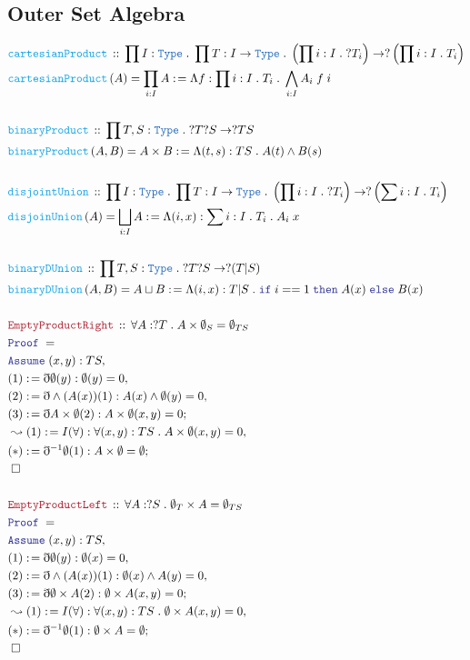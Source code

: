 \documentclass[12pt]{scrartcl}
\newcommand{\TYPE}[1]{\textcolor{NavyBlue}{\mathtt{#1}}}
\newcommand{\FUNC}[1]{\textcolor{Cerulean}{\mathtt{#1}}}
\newcommand{\LOGIC}[1]{\textcolor{Blue}{\mathtt{#1}}}
\newcommand{\THM}[1]{\textcolor{Maroon}{\mathtt{#1}}}
\renewcommand{\.}{\; . \;}
\newcommand{\de}{: \kern 0.1pc =}
\newcommand{\If}{\LOGIC{if} \;}
\newcommand{\Then}{ \; \LOGIC{then} \;}
\newcommand{\Else}{\; \LOGIC{else} \;}
\newcommand{\Act}[1]{\left( #1 \right)}
\newcommand{\Theorem}[2]{& \THM{#1} \, :: \, #2 \\ & \Proof = \\ }
\newcommand{\DeclareFunc}[2]{& \FUNC{#1} \, :: \, #2 \\}
\newcommand{\DefineNamedFunc}[4]{&  \FUNC{#1}\Act{#2} = #3 \de #4 \\}
\newcommand{\Page}[1]{ \begin{align*} #1 \end{align*}   }
\newcommand{ \bd }{ \ByDef }
\newcommand{\Type}{\TYPE{Type}}
\newcommand{\Say}[3]{& #1 \de #2 : #3, \\}
\newcommand{\Conclude}[3]{& #1 \de #2 : #3; \\}
\newcommand{\Derive}[3]{& \leadsto #1 \de #2 : #3, \\}
\newcommand{\A}{\LOGIC{Assume} \;}
\newcommand{\Assume}[2]{& \A #1 : #2, \\}
\newcommand{\QED}{\; \square}
\newcommand{\EndProof}{& \QED \\}
\newcommand{\ByDef}{\eth}
\newcommand{\Proof}{\LOGIC{Proof} \; }
\begin{document}
\subsection{Outer Set Algebra}
\Page{
	\DeclareFunc{cartesianProduct}{ \prod I : \Type \. \prod T : I \to \Type \. 
		\left( \prod i : I \. ?T_i \right)  \to ? \left( \prod i : I \. T_i \right) }
	\DefineNamedFunc{cartesianProduct}{ A  }{ \prod_{i : I} A  }
	{ \Lambda f : \prod i : I \. T_i \. \bigwedge_{i : I} A_i \;  f \; i}
	\\
	\DeclareFunc{binaryProduct}{ \prod T,S : \Type \.  ?T?S \to ?TS   }
	\DefineNamedFunc{binaryProduct}{ A,B }{A \times B}
	{ \Lambda (t,s) : TS \. A(t) \wedge B(s)  }
        \\
	\DeclareFunc{disjointUnion}{ \prod I : \Type \. \prod T : I \to \Type \. 
		\left( \prod  i : I \. ?T_i \right) 
		\to ? \left( \sum i : I \. T_i \right) }
	\DefineNamedFunc{disjoinUnion}{ A  }{ \bigsqcup_{i : I} A  }
	{ \Lambda (i,x) : \sum i : I \. T_i \.  A_i \; x}
	\\
	\DeclareFunc{binaryDUnion}{ \prod T,S : \Type \.  ?T?S \to ?(T|S)   }
	\DefineNamedFunc{binaryDUnion}{ A,B }{A \sqcup  B}
	{ \Lambda (i,x) : T | S \.  \If  i == 1 \Then A(x) \Else B(x) }
	\\
	\Theorem{EmptyProductRight}{\forall A : ?T \. A \times \emptyset_S = \emptyset_{TS}}
	\Assume{(x,y)}{TS}
	\Say{(1)}{\bd \emptyset(y)}{\emptyset(y) = 0}
	\Say{(2)}{ \bd \wedge (A(x))(1)}{A(x) \wedge \emptyset(y) = 0}
	\Conclude{(3)}{ \bd A \times \emptyset (2)}{ A \times \emptyset(x,y) = 0  }
	\Derive{(1)}{I(\forall)}{\forall (x,y) : TS \. A \times \emptyset(x,y) = 0}
	\Conclude{(*)}{ \bd^{-1}\emptyset(1)}{A \times \emptyset = \emptyset}
	\EndProof
	\\
	\Theorem{EmptyProductLeft}{\forall A : ?S \. \emptyset_T \times A = \emptyset_{TS}}
	\Assume{(x,y)}{TS}
	\Say{(1)}{\bd \emptyset(y)}{\emptyset(x) = 0}
	\Say{(2)}{ \bd \wedge (A(x))(1)}{\emptyset(x) \wedge A(y) = 0}
	\Conclude{(3)}{ \bd  \emptyset \times A (2)}{ \emptyset \times A(x,y) = 0  }
	\Derive{(1)}{I(\forall)}{\forall (x,y) : TS \.  \emptyset \times A(x,y) = 0}
	\Conclude{(*)}{ \bd^{-1}\emptyset(1)}{\emptyset \times A  = \emptyset}
	\EndProof
}
\end{document}
